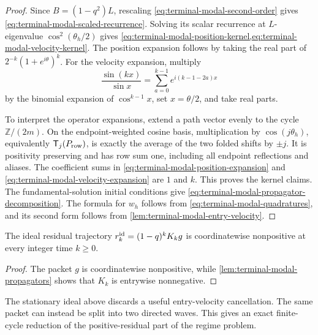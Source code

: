 \begin{proof}
Since $B=(1-q^2)L$, rescaling
\eqref{eq:terminal-modal-second-order} gives
\eqref{eq:terminal-modal-scaled-recurrence}.  Solving its scalar recurrence
at $L$-eigenvalue $\cos^2(\theta_h/2)$ gives
\cref{eq:terminal-modal-position-kernel,eq:terminal-modal-velocity-kernel}.
The position expansion follows by taking the real part of
$2^{-k}(1+e^{i\theta})^k$.  For the velocity expansion, multiply
\[
 \frac{\sin(kx)}{\sin x}=\sum_{a=0}^{k-1}e^{i(k-1-2a)x}
\]
by the binomial expansion of $\cos^{k-1}x$, set $x=\theta/2$, and take real
parts.

To interpret the operator expansions, extend a path vector evenly to the cycle
$\mathbb Z/(2m)$.  On the endpoint-weighted cosine basis, multiplication by
$\cos(j\theta_h)$, equivalently $\mathsf T_j(P_{\rm row})$, is exactly the
average of the two folded shifts by $\pm j$.  It is positivity preserving and
has row sum one, including all endpoint reflections and aliases.  The
coefficient sums in \eqref{eq:terminal-modal-position-expansion} and
\eqref{eq:terminal-modal-velocity-expansion} are $1$ and $k$.  This proves the
kernel claims.  The fundamental-solution initial conditions give
\eqref{eq:terminal-modal-propagator-decomposition}.  The formula for $w_h$
follows from \eqref{eq:terminal-modal-quadratures}, and its second form follows
from \cref{lem:terminal-modal-entry-velocity}.
\end{proof}

\begin{lemma}
\label{lem:terminal-modal-ideal-sign}
The ideal residual trajectory $r_k^{\rm id}=(1-q)^kK_kg$ is coordinatewise
nonpositive at every integer time $k\ge0$.
\end{lemma}

\begin{proof}
The packet $g$ is coordinatewise nonpositive, while
\cref{lem:terminal-modal-propagators} shows that $K_k$ is entrywise
nonnegative.
\end{proof}

The stationary ideal above discards a useful entry-velocity cancellation.
The same packet can instead be split into two directed waves.  This gives an
exact finite-cycle reduction of the positive-residual part of the regime
problem.

